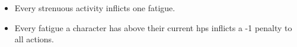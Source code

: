 \begin{itemize}
  \item
  Every strenuous activity inflicts one \gls{fatigue}.
  \item
  Every \gls{fatigue} a character has above their current \glspl{hp} inflicts a -1 penalty to all actions.
\end{itemize}
